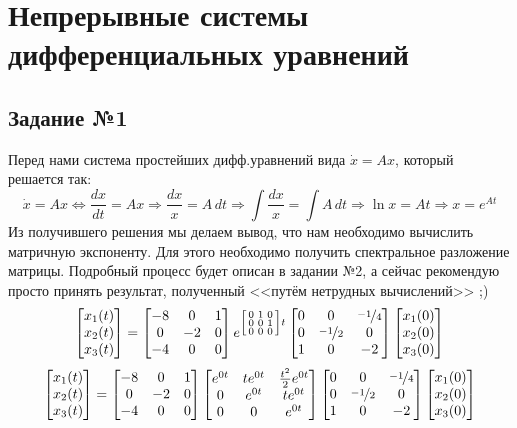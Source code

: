 \documentclass[a3paper,14pt]{extarticle}
\begin{document}
\section*{\centering Непрерывные системы дифференциальных уравнений}
\subsection*{\centering Задание №1}
Перед нами система простейших дифф.уравнений вида $\dot{x} = Ax$, который решается так:
$$\dot{x} = Ax \Leftrightarrow \frac{dx}{dt} = Ax \Rightarrow \frac{dx}{x} = A\,dt \Rightarrow \int\frac{dx}{x} = \int A\,dt \Rightarrow \ln x = At \Rightarrow x = e^{At}$$
Из получившего решения мы делаем вывод, что нам необходимо вычислить матричную экспоненту. Для этого необходимо получить спектральное разложение матрицы. Подробный процесс будет описан в задании №2, а сейчас рекомендую просто принять результат, полученный <<путём нетрудных вычислений>> ;)
$$\begin{bmatrix}
    x_1(t) \\ x_2(t) \\ x_3(t)
\end{bmatrix} = \begin{bmatrix}
    -8 & 0 & 1 \\ 0 & -2 & 0 \\ -4 & 0 & 0
\end{bmatrix} e^{\left[\begin{smallmatrix}
    0 & 1 & 0 \\ 0 & 0 & 1 \\ 0 & 0 & 0
\end{smallmatrix}\right]t} \begin{bmatrix}
    0 & 0 & \nicefrac{-1}{4} \\ 0 & \nicefrac{-1}{2} & 0 \\ 1 & 0 & -2
\end{bmatrix}\begin{bmatrix}
    x_1(0) \\ x_2(0) \\ x_3(0)
\end{bmatrix}$$
$$\begin{bmatrix}
    x_1(t) \\ x_2(t) \\ x_3(t)
\end{bmatrix} = \begin{bmatrix}
    -8 & 0 & 1 \\ 0 & -2 & 0 \\ -4 & 0 & 0
\end{bmatrix} \begin{bmatrix}
    e^{0t} & te^{0t} & \frac{t^2}{2}e^{0t} \\ 0 & e^{0t} & te^{0t} \\ 0 & 0 & e^{0t}
\end{bmatrix} \begin{bmatrix}
    0 & 0 & \nicefrac{-1}{4} \\ 0 & \nicefrac{-1}{2} & 0 \\ 1 & 0 & -2
\end{bmatrix}\begin{bmatrix}
    x_1(0) \\ x_2(0) \\ x_3(0)
\end{bmatrix}$$
\end{document}

